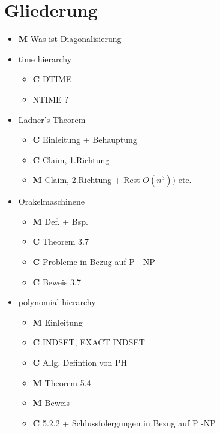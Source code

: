 \documentclass{amsart}
\begin{document}
		\section{Gliederung}
		\begin{itemize}
			\item \textbf{M} Was ist Diagonalisierung
			\item time hierarchy \begin{itemize}
				\item \textbf{C} DTIME
				\item NTIME ?
			\end{itemize}
			\item Ladner's Theorem
			\begin{itemize}
				\item \textbf{C} Einleitung + Behauptung
				\item \textbf{C} Claim, 1.Richtung
				\item \textbf{M} Claim, 2.Richtung + Rest $O(n^3))$ etc.
			\end{itemize}
			\item Orakelmaschinene
			\begin{itemize}
				\item \textbf{M} Def. + Bsp.
				\item \textbf{C} Theorem 3.7
				\item \textbf{C} Probleme in Bezug auf P - NP
				\item \textbf{C} Beweis 3.7
			\end{itemize}
			\item polynomial hierarchy
			\begin{itemize}
				\item \textbf{M} Einleitung
				\item \textbf{C} INDSET, EXACT INDSET
				\item \textbf{C} Allg. Defintion von PH
				\item \textbf{M} Theorem 5.4
				\item \textbf{M} Beweis
				\item \textbf{C} 5.2.2 + Schlussfolergungen in Bezug auf P -NP
				
			\end{itemize}
			
		\end{itemize}
\end{document}
